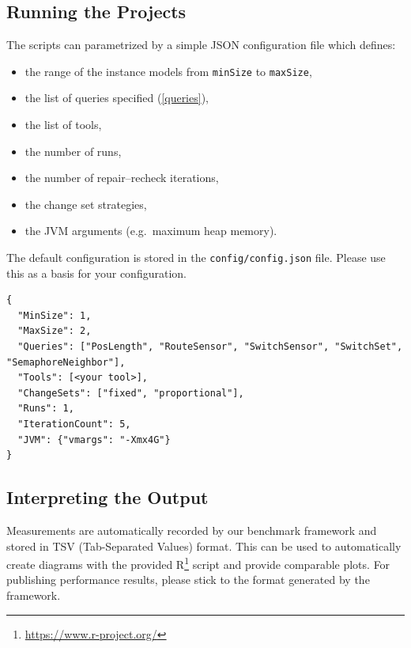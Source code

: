 \documentclass[submission,copyright,creativecommons]{eptcs}
\begin{document}
\subsection{Running the Projects}

The scripts can parametrized by a simple JSON configuration file which defines:

\begin{itemize}
	\item the range of the instance models from \texttt{minSize} to \texttt{maxSize},
	\item the list of queries specified (\autoref{queries}),
	\item the list of tools,
	\item the number of runs,
	\item the number of repair--recheck iterations,
	\item the change set strategies,
	\item the JVM arguments (e.g.\ maximum heap memory).
\end{itemize}

The default configuration is stored in the \texttt{config/config.json} file. Please use this as a basis for your configuration.

\begin{lstlisting}
{
  "MinSize": 1,
  "MaxSize": 2,
  "Queries": ["PosLength", "RouteSensor", "SwitchSensor", "SwitchSet", "SemaphoreNeighbor"],
  "Tools": [<your tool>],
  "ChangeSets": ["fixed", "proportional"],
  "Runs": 1,
  "IterationCount": 5,
  "JVM": {"vmargs": "-Xmx4G"}
}
\end{lstlisting}

\subsection{Interpreting the Output}

Measurements are automatically recorded by our benchmark framework and stored in TSV (Tab-Separated Values) format. This can be used to automatically create diagrams with the provided R\footnote{\url{https://www.r-project.org/}} script and provide comparable plots. For publishing performance results, please stick to the format generated by the framework.
\end{document}
